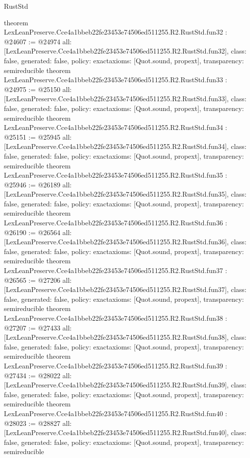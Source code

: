 \begin{lexlean}{RustStd}
\begin{coremodule}
{}
theorem LexLeanPreserve.Cce4a1bbeb22fe23453e74506ed511255.R2.RustStd.fun32 : @24607 := @24974 {
  all: [LexLeanPreserve.Cce4a1bbeb22fe23453e74506ed511255.R2.RustStd.fun32],
  class: false,
  generated: false,
  policy: exact{axioms: [Quot.sound, propext]},
  transparency: semireducible
}
theorem LexLeanPreserve.Cce4a1bbeb22fe23453e74506ed511255.R2.RustStd.fun33 : @24975 := @25150 {
  all: [LexLeanPreserve.Cce4a1bbeb22fe23453e74506ed511255.R2.RustStd.fun33],
  class: false,
  generated: false,
  policy: exact{axioms: [Quot.sound, propext]},
  transparency: semireducible
}
theorem LexLeanPreserve.Cce4a1bbeb22fe23453e74506ed511255.R2.RustStd.fun34 : @25151 := @25945 {
  all: [LexLeanPreserve.Cce4a1bbeb22fe23453e74506ed511255.R2.RustStd.fun34],
  class: false,
  generated: false,
  policy: exact{axioms: [Quot.sound, propext]},
  transparency: semireducible
}
theorem LexLeanPreserve.Cce4a1bbeb22fe23453e74506ed511255.R2.RustStd.fun35 : @25946 := @26189 {
  all: [LexLeanPreserve.Cce4a1bbeb22fe23453e74506ed511255.R2.RustStd.fun35],
  class: false,
  generated: false,
  policy: exact{axioms: [Quot.sound, propext]},
  transparency: semireducible
}
theorem LexLeanPreserve.Cce4a1bbeb22fe23453e74506ed511255.R2.RustStd.fun36 : @26190 := @26564 {
  all: [LexLeanPreserve.Cce4a1bbeb22fe23453e74506ed511255.R2.RustStd.fun36],
  class: false,
  generated: false,
  policy: exact{axioms: [Quot.sound, propext]},
  transparency: semireducible
}
theorem LexLeanPreserve.Cce4a1bbeb22fe23453e74506ed511255.R2.RustStd.fun37 : @26565 := @27206 {
  all: [LexLeanPreserve.Cce4a1bbeb22fe23453e74506ed511255.R2.RustStd.fun37],
  class: false,
  generated: false,
  policy: exact{axioms: [Quot.sound, propext]},
  transparency: semireducible
}
theorem LexLeanPreserve.Cce4a1bbeb22fe23453e74506ed511255.R2.RustStd.fun38 : @27207 := @27433 {
  all: [LexLeanPreserve.Cce4a1bbeb22fe23453e74506ed511255.R2.RustStd.fun38],
  class: false,
  generated: false,
  policy: exact{axioms: [Quot.sound, propext]},
  transparency: semireducible
}
theorem LexLeanPreserve.Cce4a1bbeb22fe23453e74506ed511255.R2.RustStd.fun39 : @27434 := @28022 {
  all: [LexLeanPreserve.Cce4a1bbeb22fe23453e74506ed511255.R2.RustStd.fun39],
  class: false,
  generated: false,
  policy: exact{axioms: [Quot.sound, propext]},
  transparency: semireducible
}
theorem LexLeanPreserve.Cce4a1bbeb22fe23453e74506ed511255.R2.RustStd.fun40 : @28023 := @28827 {
  all: [LexLeanPreserve.Cce4a1bbeb22fe23453e74506ed511255.R2.RustStd.fun40],
  class: false,
  generated: false,
  policy: exact{axioms: [Quot.sound, propext]},
  transparency: semireducible
}
\end{coremodule}
\end{lexlean}
